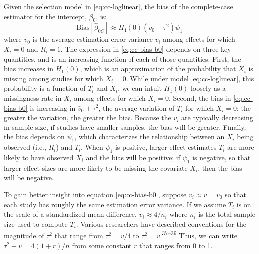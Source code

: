 \documentclass[
]{article}
\begin{document}
Given the selection model in \eqref{eq:cc-loglinear}, the bias of the complete-case estimator for the intercept, \(\beta_0\), is:
\begin{equation}
\text{Bias}[\hat{\beta}_{0C}] 
  \approx H_1(0)(\bar{v}_0 + \tau^2)\psi_1
\label{eq:cc-bias-b0}
\end{equation}
where \(\bar{v}_0\) is the average estimation error variance \(v_i\) among effects for which \(X_i = 0\) and \(R_i = 1\).
The expression in \eqref{eq:cc-bias-b0} depends on three key quantities, and is an increasing function of each of those quantities.
First, the bias increases in \(H_1(0)\), which is an approximation of the probability that \(X_i\) is missing among studies for which \(X_i = 0\).
While under model \eqref{eq:cc-loglinear}, this probability is a function of \(T_i\) and \(X_i\), we can intuit \(H_1(0)\) loosely as a missingness rate in \(X_i\) among effects for which \(X_i = 0\).
Second, the bias in \eqref{eq:cc-bias-b0} is increasing in \(\bar{v}_0 + \tau^2\), the average variation of \(T_i\) for which \(X_i = 0\); the greater the variation, the greater the bias.
Because the \(v_i\) are typically decreasing in sample size, if studies have smaller samples, the bias will be greater.
Finally, the bias depends on \(\psi_1\), which characterizes the relationship between an \(X_i\) being observed (i.e., \(R_i\)) and \(T_i\).
When \(\psi_1\) is positive, larger effect estimates \(T_i\) are more likely to have observed \(X_i\) and the bias will be positive; if \(\psi_1\) is negative, so that larger effect sizes are more likely to be missing the covariate \(X_i\), then the bias will be negative.

To gain better insight into equation \eqref{eq:cc-bias-b0}, suppose \(v_i \approx v = \bar{v}_0\) so that each study has roughly the same estimation error variance.
If we assume \(T_i\) is on the scale of a standardized mean difference, \(v_i \approx 4/n_i\) where \(n_i\) is the total sample size used to compute \(T_i\).
Various researchers have described conventions for the magnitude of \(\tau^2\) that range from \(\tau^2 = v/4\) to \(\tau^2 = v\).\textsuperscript{37--39}
Thus, we can write \(\tau^2 + v = 4(1 + r)/n\) from some constant \(r\) that ranges from 0 to 1.
\end{document}
